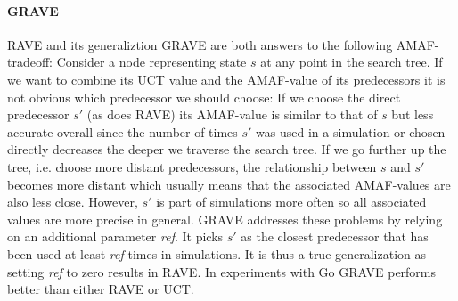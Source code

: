 \paragraph{GRAVE}
RAVE and its generaliztion GRAVE \cite{cazenave2015generalized} are both answers to the following AMAF-tradeoff: Consider a node representing state $s$ at any point in the search tree. If we want to combine its UCT value and the AMAF-value of its predecessors it is not obvious which predecessor we should choose: If we choose the direct predecessor $s'$ (as does RAVE) its AMAF-value is similar to that of $s$ but less accurate overall since the number of times $s'$ was used in a simulation or chosen directly decreases the deeper we traverse the search tree. If we go further up the tree, i.e. choose more distant predecessors, the relationship between $s$ and $s'$ becomes more distant which usually means that the associated AMAF-values are also less close. However, $s'$ is part of simulations more often so all associated values are more precise in general. GRAVE addresses these problems by relying on an additional parameter \textit{ref}. It picks $s'$ as the closest predecessor that has been used at least \textit{ref} times in simulations. It is thus a true generalization as setting \textit{ref} to zero results in RAVE. In experiments with Go GRAVE performs better than either RAVE or UCT.
